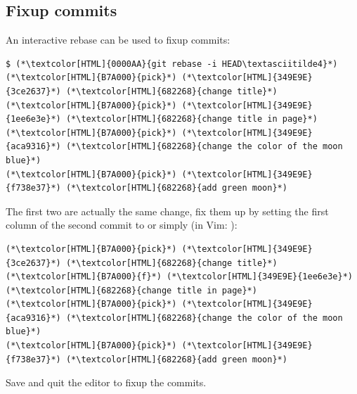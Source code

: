 \subsection{Fixup commits}
\begin{frame}[fragile]
  \subslidetitle
  An interactive rebase can be used to fixup commits:

  \begin{lstlisting}
$ (*\textcolor[HTML]{0000AA}{git rebase -i HEAD\textasciitilde4}*)
(*\textcolor[HTML]{B7A000}{pick}*) (*\textcolor[HTML]{349E9E}{3ce2637}*) (*\textcolor[HTML]{682268}{change title}*)
(*\textcolor[HTML]{B7A000}{pick}*) (*\textcolor[HTML]{349E9E}{1ee6e3e}*) (*\textcolor[HTML]{682268}{change title in page}*)
(*\textcolor[HTML]{B7A000}{pick}*) (*\textcolor[HTML]{349E9E}{aca9316}*) (*\textcolor[HTML]{682268}{change the color of the moon blue}*)
(*\textcolor[HTML]{B7A000}{pick}*) (*\textcolor[HTML]{349E9E}{f738e37}*) (*\textcolor[HTML]{682268}{add green moon}*)
\end{lstlisting}

  The first two are actually the same change, fix them up by setting the first
  column of the second commit to  or simply  (in Vim: ):

  \begin{lstlisting}
(*\textcolor[HTML]{B7A000}{pick}*) (*\textcolor[HTML]{349E9E}{3ce2637}*) (*\textcolor[HTML]{682268}{change title}*)
(*\textcolor[HTML]{B7A000}{f}*) (*\textcolor[HTML]{349E9E}{1ee6e3e}*) (*\textcolor[HTML]{682268}{change title in page}*)
(*\textcolor[HTML]{B7A000}{pick}*) (*\textcolor[HTML]{349E9E}{aca9316}*) (*\textcolor[HTML]{682268}{change the color of the moon blue}*)
(*\textcolor[HTML]{B7A000}{pick}*) (*\textcolor[HTML]{349E9E}{f738e37}*) (*\textcolor[HTML]{682268}{add green moon}*)
\end{lstlisting}

  Save and quit the editor to fixup the commits.
\end{frame}

